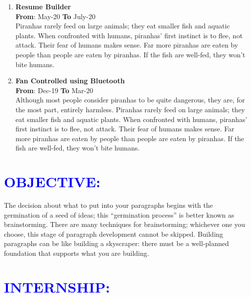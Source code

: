 \documentclass{article}
\begin{document}
\begin{multicols}{2}
\begin{enumerate}
	\item {\textbf{Resume Builder}}\\
	\hfill {\textbf{From}}: May-20 {\textbf{To}} July-20\\
	Piranhas rarely feed on large animals; they eat smaller fish and aquatic plants. When confronted with humans, piranhas’ first instinct is to flee, not attack. Their fear of humans makes sense. Far more piranhas are eaten by people than people are eaten by piranhas. If the fish are well-fed, they won’t bite humans.
	\item {\textbf{Fan Controlled using Bluetooth}}\\
	\hfill {\textbf{From}}: Dec-19 {\textbf{To}} Mar-20\\
	Although most people consider piranhas to be quite dangerous, they are, for the most part, entirely harmless. Piranhas rarely feed on large animals; they eat smaller fish and aquatic plants. When confronted with humans, piranhas’ first instinct is to flee, not attack. Their fear of humans makes sense. Far more piranhas are eaten by people than people are eaten by piranhas. If the fish are well-fed, they won’t bite humans.
\end{enumerate}

\vspace{3pt}
\columnbreak
\section*{\large{\textcolor{blue}{\uppercase{objective:}}}}

\begin{flushleft}
The decision about what to put into your paragraphs begins with the germination of a seed of ideas; this “germination process” is better known as brainstorming. There are many techniques for brainstorming; whichever one you choose, this stage of paragraph development cannot be skipped. Building paragraphs can be like building a skyscraper: there must be a well-planned foundation that supports what you are building.
\end{flushleft}
\vspace{5pt}

\section*{\large{\textcolor{blue}{\uppercase{Internship:}}}}


\end{multicols}
\end{document}
